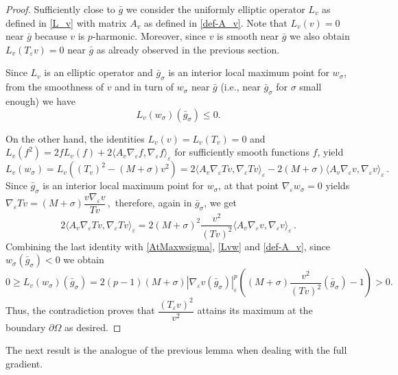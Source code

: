 \documentclass[10pt]{amsart}
\numberwithin{equation}{section}
\newtheorem{proposition}[theorem]{Proposition}
\theoremstyle{definition}
\newcommand{\eps}{\varepsilon}
\newcommand{\escal}[2]{\langle {#1},{#2}\rangle_{\eps}}
\newcommand{\He}{\mathbb{H}}
\newcommand{\egrad}{\nabla_{\eps}}
\begin{document}
\begin{proof}
Sufficiently close to $\bar{g}$ we consider the uniformly elliptic operator
$L_v$ as defined in \eqref{L_v} with matrix $A_v$ as defined in \eqref{def-A_v}.
Note that $L_v(v)=0$ near $\bar{g}$ because $v$ is $p$-harmonic. Moreover, since $ v$ is smooth near $\bar{g}$ we also obtain $L_v(T_\varepsilon v)=0$ near $\bar{g}$ as already observed in the previous section.

Since $L_v$ is an elliptic operator and $\bar{g}_\sigma$ is an interior local maximum point for $w_\sigma$, from the smoothness of $v$ and in turn of $w_\sigma$ near $\bar{g}$ (i.e., near $\bar{g}_\sigma$ for $\sigma$ small enough) we have 
\begin{equation}\label{AtMaxwsigma}
L_v (w_\sigma)(\bar{g}_\sigma) \leq 0.
\end{equation}

On the other hand, the identities $L_v(v)=L_v(T_v)=0$ and  $L_v(f^2)=2 f L_v(f)+2\escal{A_v \egrad f}{\egrad f} $ for sufficiently smooth functions $f$, yield
\begin{equation}
\label{Lvw}
L_v(w_\sigma) = L_v \left((T_ v)^2 - (M+\sigma) v^2\right) = 2 \escal{A_v \egrad T v}{\egrad T v} - 2(M+\sigma)  \escal{A_v \egrad  v}{\egrad  v}
 \, .
\end{equation}
Since $\bar{g}_\sigma$ is an interior local maximum point for $w_\sigma$, at that point 
$\egrad w_\sigma = 0 $ yields $\egrad T v = (M+\sigma) \dfrac{v \egrad v}{T  v} \, ,$
\noindent therefore, again in $\bar{g}_\sigma$, we get
$$ 2 \escal{A_v \egrad Tv}{\egrad Tv} = 2 (M+\sigma)^2 \dfrac{v^2}{(Tv)^2}   \escal{A_v \egrad  v}{\egrad  v} \, .$$
\noindent Combining the last identity with \eqref{AtMaxwsigma}, \eqref{Lvw}  and \eqref{def-A_v}, since $w_\sigma(\bar{g}_\sigma)<0$ we obtain  
$$0 \geq L_v (w_\sigma)(\bar{g}_\sigma)=  2 (p-1) (M+\sigma)|\egrad v (\bar{g}_\sigma)|_\varepsilon^{p} \left(   (M+\sigma) \dfrac{v^2}{(T v)^2}(\bar{g}_\sigma) -1\right) >0.$$
\noindent Thus, the contradiction proves that
$\dfrac{ (T_\varepsilon v)^2}{v^2}$ attains its maximum at the boundary $\partial \Omega$ as desired.
\end{proof}

 The next result is the analogue of the previous lemma when dealing with the full gradient. 
  
\end{document}
